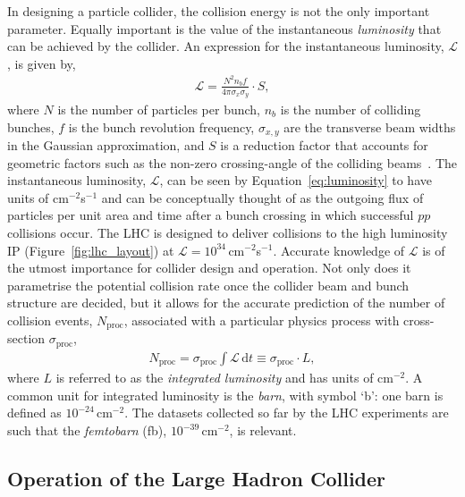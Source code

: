 In designing a particle collider, the collision energy is not the only important parameter.
Equally important is the value of the instantaneous \textit{luminosity}
that can be achieved by the collider.
An expression for the instantaneous luminosity, $\mathcal{L}$, is given by,
\begin{align}
    \mathcal{L} = \frac{N^2 n_b f}{4 \pi \sigma_x \sigma_y} \cdot S,
    \label{eq:luminosity}
\end{align}
where $N$ is the number of particles per bunch, $n_b$ is the number of colliding bunches,
$f$ is the bunch revolution frequency, $\sigma_{x,y}$ are the transverse beam widths in the
Gaussian approximation, and $S$ is a reduction factor that accounts for geometric factors
such as the non-zero crossing-angle of the colliding beams~\cite{LHCDesignIII,LumiConcept}.
The instantaneous luminosity, $\mathcal{L}$, can be seen by Equation~\ref{eq:luminosity}
to have units of cm$^{-2}$s$^{-1}$ and can be conceptually thought of as the
outgoing flux of particles per unit area and time after a bunch crossing in which successful $pp$
collisions occur.
The LHC is designed to deliver collisions to the high luminosity IP (Figure~\ref{fig:lhc_layout})
at $\mathcal{L} = 10^{34}$\,cm$^{-2}$s$^{-1}$.
Accurate knowledge of $\mathcal{L}$ is of the utmost importance for collider design and operation.
Not only does it parametrise the potential collision rate once the collider beam and bunch
structure are decided, but it allows for the accurate prediction of the number
of collision events, $N_{\text{proc}}$, associated with a particular physics process
with cross-section $\sigma_{\text{proc}}$,
\begin{align}
    N_{\text{proc}} = \sigma_{\text{proc}} \int \mathcal{L}\, \mathrm{d}t \equiv \sigma_{\text{proc}} \cdot L,
    \label{eq:n_exp_lumi}
\end{align}
where $L$ is referred to as the \textit{integrated luminosity} and has units of cm$^{-2}$.
A common unit for integrated luminosity is the \textit{barn}, with symbol `b': one barn is defined as $10^{-24}$\,cm$^{-2}$.
The datasets collected so far by the LHC experiments are such that the \textit{femtobarn} (fb), $10^{-39}$\,cm$^{-2}$, is relevant.

\subsection{Operation of the Large Hadron Collider}
\label{sec:lhc_operation}

